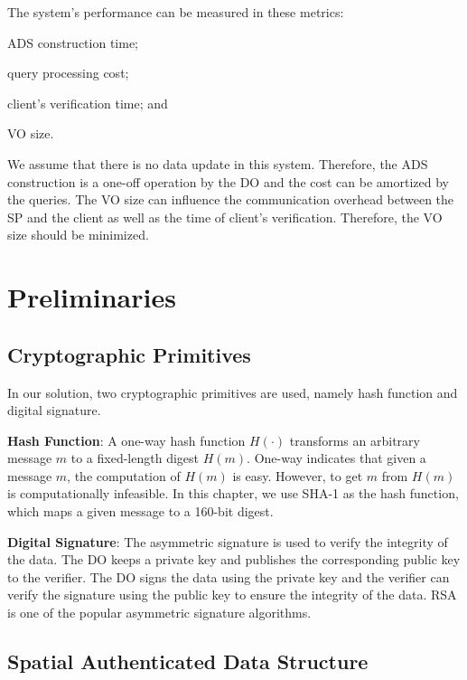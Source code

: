 The system's performance can be measured in these metrics:
\begin{inlineenum}
\item ADS construction time;
\item query processing cost;
\item client's verification time; and
\item VO size.
\end{inlineenum}
We assume that there is no data update in this system. Therefore, the ADS construction is a one-off operation by the DO and the cost can be amortized by the queries. The VO size can influence the communication overhead between the SP and the client as well as the time of client's verification. Therefore, the VO size should be minimized.

\section{Preliminaries}\label{sec:knn:prelim}

\subsection{Cryptographic Primitives}

In our solution, two cryptographic primitives are used, namely hash function and digital signature.

\textbf{Hash Function}: A one-way hash function $H(\cdot)$ transforms an arbitrary message $m$ to a fixed-length digest $H(m)$. One-way indicates that given a message $m$, the computation of $H(m)$ is easy. However, to get $m$ from $H(m)$ is computationally infeasible. In this chapter, we use SHA-1 as the hash function, which maps a given message to a 160-bit digest.

\textbf{Digital Signature}: The asymmetric signature is used to verify the integrity of the data. The DO keeps a private key and publishes the corresponding public key to the verifier. The DO signs the data using the private key and the verifier can verify the signature using the public key to ensure the integrity of the data. RSA is one of the popular asymmetric signature algorithms.

\subsection{Spatial Authenticated Data Structure}

